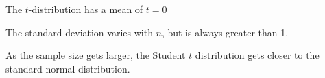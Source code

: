 \documentclass{beamer}
\begin{document}
\begin{frame}[fragile]
  \begin{note}
    The $t$-distribution has a mean of $t=0$ 

    \vspace{1mm}
    The standard deviation varies with $n$, but is always greater than 1.
  \end{note}

  \begin{note}
    As the sample size gets larger, the Student $t$ distribution gets closer to the standard normal distribution.
  \end{note}
\end{frame}











\end{document}

